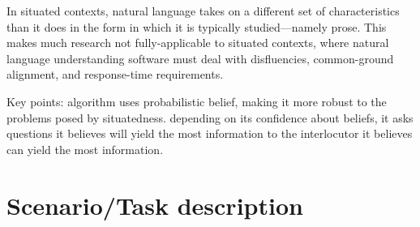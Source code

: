 \documentclass[12pt]{article}
\begin{document}



In situated contexts, natural language takes on a different set of
characteristics than it does in the form in which it is typically
studied---namely prose. This makes much research not fully-applicable
to situated contexts, where natural language understanding software
must deal with disfluencies, common-ground alignment, and
response-time requirements.

Key points: algorithm uses probabilistic belief, making it more robust
to the problems posed by situatedness. depending on its confidence
about beliefs, it asks questions it believes will yield the most
information to the interlocutor it believes can yield the most
information.

\section{Scenario/Task description}

\end{document}
